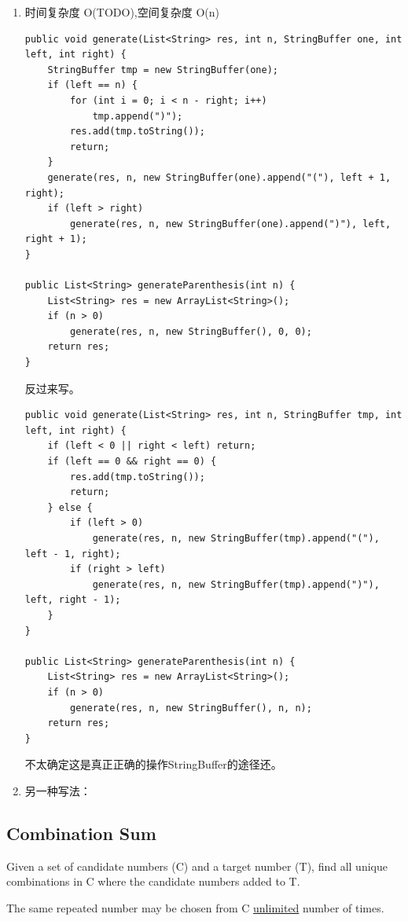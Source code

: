 \documentclass[12pt]{book}
\begin{document}
\begin{enumerate}
\item 时间复杂度 O(TODO),空间复杂度 O(n)
\label{sec-11-1-3-1}
\lstset{language=java,label= ,caption= ,numbers=none}
\begin{lstlisting}
public void generate(List<String> res, int n, StringBuffer one, int left, int right) {
    StringBuffer tmp = new StringBuffer(one);
    if (left == n) {
        for (int i = 0; i < n - right; i++)
            tmp.append(")");
        res.add(tmp.toString());
        return;
    }
    generate(res, n, new StringBuffer(one).append("("), left + 1, right);
    if (left > right)
        generate(res, n, new StringBuffer(one).append(")"), left, right + 1);
}
        
public List<String> generateParenthesis(int n) {
    List<String> res = new ArrayList<String>();
    if (n > 0)
        generate(res, n, new StringBuffer(), 0, 0);
    return res;
}
\end{lstlisting}

反过来写。
\lstset{language=java,label= ,caption= ,numbers=none}
\begin{lstlisting}
public void generate(List<String> res, int n, StringBuffer tmp, int left, int right) {
    if (left < 0 || right < left) return;
    if (left == 0 && right == 0) { 
        res.add(tmp.toString());
        return;
    } else {
        if (left > 0) 
            generate(res, n, new StringBuffer(tmp).append("("), left - 1, right);
        if (right > left) 
            generate(res, n, new StringBuffer(tmp).append(")"), left, right - 1);
    }
}
        
public List<String> generateParenthesis(int n) {
    List<String> res = new ArrayList<String>();
    if (n > 0) 
        generate(res, n, new StringBuffer(), n, n);
    return res;
}
\end{lstlisting}
不太确定这是真正正确的操作StringBuffer的途径还。

\item 另一种写法：
\label{sec-11-1-3-2}
\end{enumerate}
\subsection{Combination Sum}
\label{sec-11-1-4}
Given a set of candidate numbers (C) and a target number (T), find all unique combinations in C where the candidate numbers added to T.

The same repeated number may be chosen from C \uline{unlimited} number of times.
\end{document}
